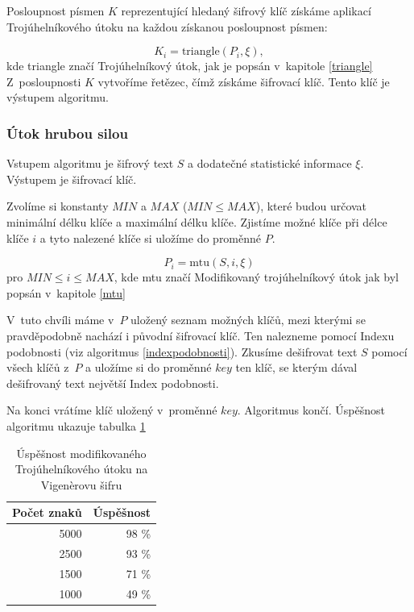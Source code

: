 \documentclass[12pt]{article}
\theoremstyle{definition}
\newcommand{\stats}{\xi}
\begin{document}
Posloupnost písmen $K$ reprezentující hledaný šifrový klíč získáme aplikací Trojúhelníkového útoku na každou získanou posloupnost písmen:

$$K_i = \mbox{triangle}(P_i, \stats),$$
kde triangle značí Trojúhelníkový útok, jak je popsán v~kapitole \ref{triangle} Z~posloupnosti $K$ vytvoříme řetězec, čímž získáme šifrovací klíč. Tento klíč je výstupem algoritmu.


\subsubsection{Útok hrubou silou}
\label{brutevig}
Vstupem algoritmu je šifrový text $S$ a dodatečné statistické informace $\stats$. Výstupem je šifrovací klíč.

Zvolíme si konstanty $MIN$ a $MAX$ ($MIN\le MAX$), které budou určovat minimální délku klíče a maximální délku klíče. Zjistíme možné klíče při délce klíče $i$ a tyto nalezené klíče si uložíme do proměnné $P$.

$$P_i = \mbox{mtu}(S, i, \stats)$$
pro $MIN \le i \le MAX$, kde mtu značí Modifikovaný trojúhelníkový útok jak byl popsán v~kapitole \ref{mtu} 

V~tuto chvíli máme v~$P$ uložený seznam možných klíčů, mezi kterými se pravděpodobně nachází i původní šifrovací klíč. Ten nalezneme pomocí Indexu podobnosti (viz algoritmus \ref{indexpodobnosti}). Zkusíme dešifrovat text $S$ pomocí všech klíčů z~$P$ a uložíme si do proměnné $key$ ten klíč, se kterým dával dešifrovaný text největší Index podobnosti. 

Na konci vrátíme klíč uložený v~proměnné $key$. Algoritmus končí. Úspěšnost algoritmu ukazuje tabulka \ref{tabvigtriangle}

\begin{table}[ht]
  \begin{center}
    \begin{tabular}{|r|r|}
    \hline
    Počet znaků&Úspěšnost\\
    \hline
    5000&98 \%\\
    2500&93 \%\\
    1500&71 \%\\
    1000&49 \%\\
    \hline
    \end{tabular}
    \caption{Úspěšnost modifikovaného Trojúhelníkového útoku na Vigenèrovu šifru} 
    \label{tabvigtriangle}
  \end{center}
\end{table}
\end{document}
